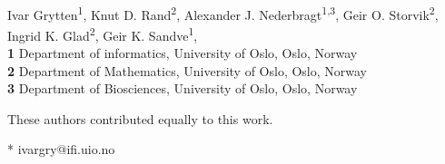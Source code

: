 \documentclass[10pt,letterpaper]{article}
\begin{document}
\vspace*{0.2in}

\begin{flushleft}
{\Large
\textbf{} %
}
\newline
\\
Ivar Grytten\textsuperscript{1\Yinyang*},
Knut D. Rand\textsuperscript{2\Yinyang},
Alexander J. Nederbragt\textsuperscript{1,3},
Geir O. Storvik\textsuperscript{2},
Ingrid K. Glad\textsuperscript{2},
Geir K. Sandve\textsuperscript{1},
\\
\bigskip
\textbf{1} Department of informatics, University of Oslo, Oslo, Norway
\\
\textbf{2} Department of Mathematics, University of Oslo, Oslo, Norway
\\
\textbf{3} Department of Biosciences, University of Oslo, Oslo, Norway
\\
\bigskip

% 
%
\Yinyang These authors contributed equally to this work.





* ivargry@ifi.uio.no

\end{flushleft}
\end{document}

